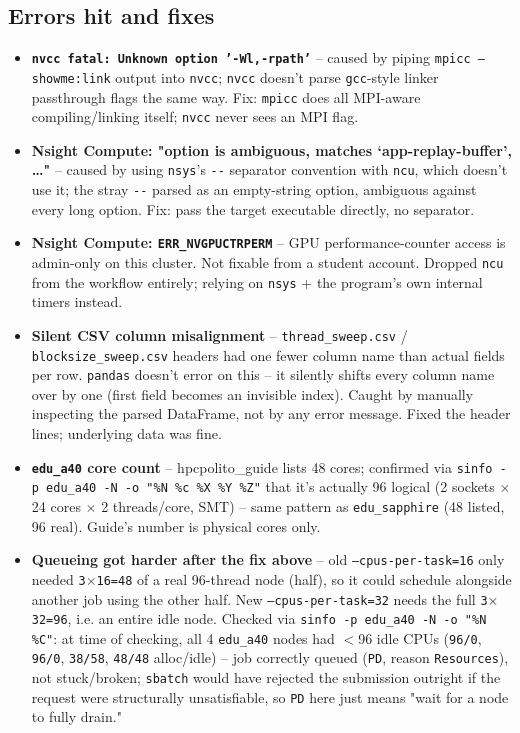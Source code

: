 \subsection{Errors hit and fixes}
\begin{itemize}
\item \textbf{\texttt{nvcc fatal: Unknown option '-Wl,-rpath'}} -- caused by piping \texttt{mpicc --showme:link} output into \texttt{nvcc}; \texttt{nvcc} doesn't parse \texttt{gcc}-style linker passthrough flags the same way. Fix: \texttt{mpicc} does all MPI-aware compiling/linking itself; \texttt{nvcc} never sees an MPI flag.
\item \textbf{Nsight Compute: "option is ambiguous, matches `app-replay-buffer', \ldots"} -- caused by using \texttt{nsys}'s \texttt{-{}-} separator convention with \texttt{ncu}, which doesn't use it; the stray \texttt{-{}-} parsed as an empty-string option, ambiguous against every long option. Fix: pass the target executable directly, no separator.
\item \textbf{Nsight Compute: \texttt{ERR\_NVGPUCTRPERM}} -- GPU performance-counter access is admin-only on this cluster. Not fixable from a student account. Dropped \texttt{ncu} from the workflow entirely; relying on \texttt{nsys} + the program's own internal timers instead.
\item \textbf{Silent CSV column misalignment} -- \texttt{thread\_sweep.csv} / \texttt{blocksize\_sweep.csv} headers had one fewer column name than actual fields per row. \texttt{pandas} doesn't error on this -- it silently shifts every column name over by one (first field becomes an invisible index). Caught by manually inspecting the parsed DataFrame, not by any error message. Fixed the header lines; underlying data was fine.
\item \textbf{\texttt{edu\_a40} core count} -- hpcpolito\_guide lists 48 cores; confirmed via \texttt{sinfo -p edu\_a40 -N -o "\%N \%c \%X \%Y \%Z"} that it's actually 96 logical (2 sockets $\times$ 24 cores $\times$ 2 threads/core, SMT) -- same pattern as \texttt{edu\_sapphire} (48 listed, 96 real). Guide's number is physical cores only.
\item \textbf{Queueing got harder after the fix above} -- old \texttt{--cpus-per-task=16} only needed \texttt{3$\times$16=48} of a real 96-thread node (half), so it could schedule alongside another job using the other half. New \texttt{--cpus-per-task=32} needs the full \texttt{3$\times$32=96}, i.e. an entire idle node. Checked via \texttt{sinfo -p edu\_a40 -N -o "\%N \%C"}: at time of checking, all 4 \texttt{edu\_a40} nodes had $<$96 idle CPUs (\texttt{96/0}, \texttt{96/0}, \texttt{38/58}, \texttt{48/48} alloc/idle) -- job correctly queued (\texttt{PD}, reason \texttt{Resources}), not stuck/broken; \texttt{sbatch} would have rejected the submission outright if the request were structurally unsatisfiable, so \texttt{PD} here just means "wait for a node to fully drain."
\end{itemize}

